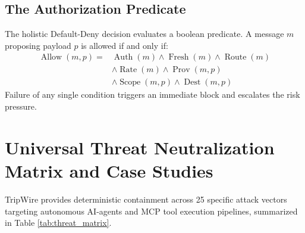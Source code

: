 \documentclass[10pt,a4paper]{article}
\begin{document}
\subsection{The Authorization Predicate}
The holistic Default-Deny decision evaluates a boolean predicate. A message $m$ proposing payload $p$ is allowed if and only if:
\begin{equation}
\begin{aligned}
\operatorname{Allow}(m,p) ={}&
\operatorname{Auth}(m) \land \operatorname{Fresh}(m) \land \operatorname{Route}(m) \\
&\land \operatorname{Rate}(m) \land \operatorname{Prov}(m,p) \\
&\land \operatorname{Scope}(m,p) \land \operatorname{Dest}(m,p)
\end{aligned}
\end{equation}
Failure of any single condition triggers an immediate block and escalates the risk pressure.

\section{Universal Threat Neutralization Matrix and Case Studies}

TripWire provides deterministic containment across 25 specific attack vectors targeting autonomous AI-agents and MCP tool execution pipelines, summarized in Table \ref{tab:threat_matrix}.
\end{document}
